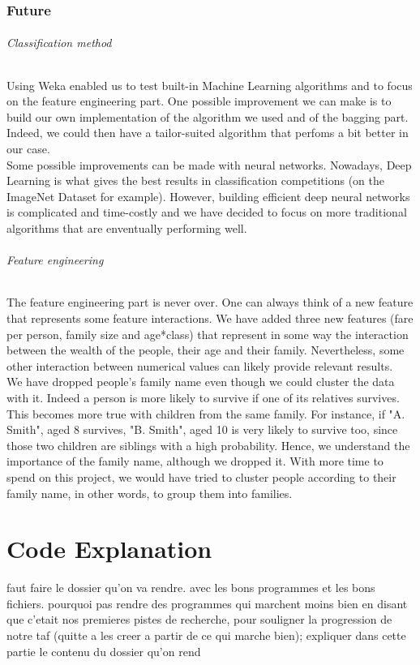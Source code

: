 \documentclass[11pt,a4paper,portrait]{article}
\begin{document}
\section{Future}
\paragraph{Classification method}
Using Weka enabled us to test built-in Machine Learning algorithms and to focus on the feature engineering part. One possible improvement we can make is to build our own implementation of the algorithm we used and of the bagging part. Indeed, we could then have a tailor-suited algorithm that perfoms a bit better in our case.\\ Some possible improvements can be made with neural networks. Nowadays, Deep Learning is what gives the best results in classification competitions (on the ImageNet Dataset for example). However, building efficient deep neural networks is complicated and time-costly and we have decided to focus on more traditional algorithms that are enventually performing well.

\paragraph{Feature engineering}
The feature engineering part is never over. One can always think of a new feature that represents some feature interactions. We have added three new features (fare per person, family size and  age*class) that represent in some way the interaction between the wealth of the people, their age and their family. Nevertheless, some other interaction between numerical values can likely provide relevant results.\\
We have dropped people's family name even though we could cluster the data with it. Indeed a person is more likely to survive if one of its relatives survives. This becomes more true with children from the same family. For instance, if "A. Smith", aged 8 survives, "B. Smith", aged 10 is very likely to survive too, since those two children are siblings with a high probability. Hence, we understand the importance of the family name, although we dropped it. With more time to spend on this project, we would have tried to cluster people according to their family name, in other words, to group them into families.

\part*{Code Explanation}
faut faire le dossier qu'on va rendre. avec les bons programmes et les bons fichiers. pourquoi pas rendre des programmes qui marchent moins bien en disant que c'etait nos premieres pistes de recherche, pour souligner la progression de notre taf (quitte a les creer a partir de ce qui marche bien);
expliquer dans cette partie le contenu du dossier qu'on rend
\end{document}
